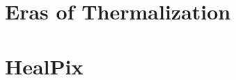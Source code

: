\begin{appendices}
\chapter{\label{appendix} Eras of Thermalization}
\chapter{\label{key} HealPix}
\end{appendices}


\setcounter{equation}{0}
\setcounter{table}{0}
\setcounter{figure}{0}


    



